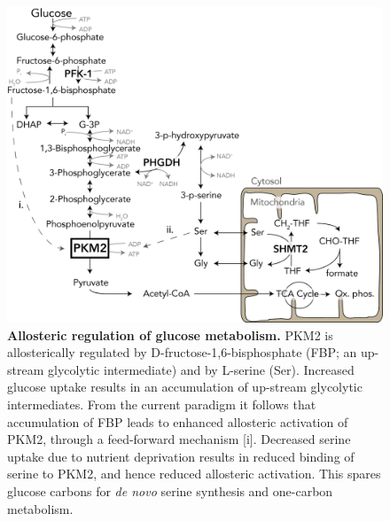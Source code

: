 \begin{figure}[!ht]
\includegraphics[scale=0.65]{pkm2_met_network.png}
\caption[Allosteric regulation of glucose metabolism.]{\textbf{Allosteric regulation of glucose metabolism.} PKM2 is allosterically regulated by D-fructose-1,6-bisphosphate (FBP; an up-stream glycolytic intermediate) and by L-serine (Ser). Increased glucose uptake results in an accumulation of up-stream glycolytic intermediates. From the current paradigm it follows that accumulation of FBP leads to enhanced allosteric activation of PKM2, through a feed-forward mechanism [i]. Decreased serine uptake due to nutrient deprivation results in reduced binding of serine to PKM2, and hence reduced allosteric activation. This spares glucose carbons for \textit{de novo} serine synthesis and one-carbon metabolism.}
\label{fig:pkm2_met_network}
\end{figure}
%
%

\clearpage

